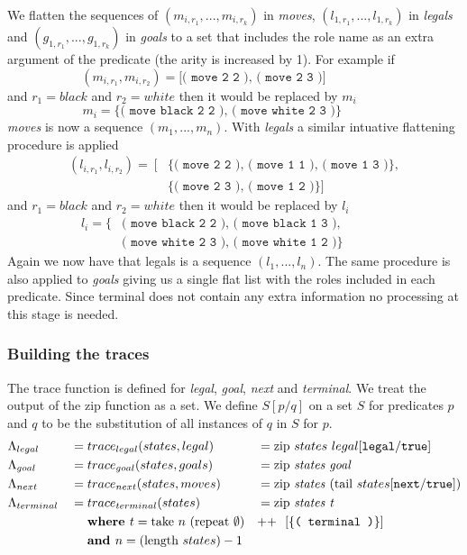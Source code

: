 We flatten the sequences of $(m_{i,r_1},...,m_{i,r_k})$ in \textit{moves}, $(l_{1,r_1},...,l_{1,r_k})$ in \textit{legals} and $(g_{1,r_1},...,g_{1,r_k})$ in \textit{goals} to a set that includes the role name as an extra argument of the predicate (the arity is increased by 1). For example if 
\[(m_{i,r_1},m_{i,r_2}) = \texttt{[( move 2 2 ), ( move 2 3 )]}\ \ \ \ \ \ \ \ \ \ \ \ \ \ \ \ \ \ \ \ \ \ \]
and $r_1 = black$ and $r_2 = white$ then it would be replaced by $m_i$
\[m_i = \texttt{\{( move black 2 2 ), ( move white 2 3 )\}}\ \ \ \ \ \ \ \ \ \ \ \ \ \ \ \ \]
\textit{moves} is now a sequence $(m_1,...,m_n)$. With \textit{legals} a similar intuative flattening procedure is applied
\begin{align*}
(l_{i,r_1},l_{i,r_2}) =\ [&\{\texttt{( move 2 2 ), ( move 1 1 ), ( move 1 3 )}\}, \\
&\{\texttt{( move 2 3 ), ( move 1 2 )}\}]
\end{align*}
and $r_1 = black$ and $r_2 = white$ then it would be replaced by $l_i$
\begin{align*}
l_i = \{&\texttt{( move black 2 2 ), ( move black 1 3 ),}\ \ \ \ \ \ \ \ \ \ \ \ \ \ \ \ \ \\ &\texttt{( move white 2 3 ), ( move white 1 2 )}\}
\end{align*}
Again we now have that legals is a sequence $(l_1,...,l_n)$. The same procedure is also applied to \textit{goals} giving us a single flat list with the roles included in each predicate. Since terminal does not contain any extra information no processing at this stage is needed. 
\subsubsection{Building the traces}
The trace function is defined for \textit{legal}, \textit{goal}, \textit{next} and \textit{terminal}. We treat the output of the zip function as a set. We define $S[p/q]$ on a set $S$ for predicates $p$ and $q$ to be the substitution of all instances of $q$ in $S$ for $p$.
\begin{align*}
&\Lambda_{legal} &&= trace_{legal}(states,legal) &&= \text{zip } states\ legal[\texttt{legal}/\texttt{true}] \\
&\Lambda_{goal} &&= trace_{goal}(states,goals) &&= \text{zip \textit{states goal}} \\
&\Lambda_{next} &&= trace_{next}(states,moves) &&= \text{zip \textit{states} } \text{(tail }states[\texttt{next}/\texttt{true}]) \\
&\Lambda_{terminal} &&= trace_{terminal}(states) &&= \text{zip \textit{states t}} \\
&&&\ \ \ \ \textbf{where  } t =\text{take } n\ (\text{repeat } \emptyset ) &&\text{++}\ \ [\{\texttt{( terminal )}\}] \\
&&&\ \ \ \ \textbf{and } n = (\text{length }states) - 1 &&
\end{align*}

